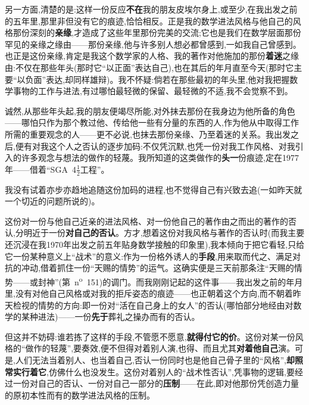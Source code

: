 另一方面,清楚的是:这样一份反应\textbf{不在}我的朋友皮埃尔身上,或至少,在我出发之前的五年里,那里非但没有它的痕迹,恰恰相反。正是我的数学进法风格与他自己的风格那份深刻的\textbf{亲缘},才造成了这些年里那份完美的交流;它也是我们在数学层面那份罕见的亲缘之缘由——那份亲缘,他与许多别人想必都曾感到,一如我自己曾感到。也正是这份亲缘,肯定是我这个数学家的人格、我的著作对他施加的那份\textbf{着迷}之缘由:不仅在那些年头(那时它“以正面”表达自己),也在其后的年月直至今天(那时它主要“以负面”表达,却同样雄辩)。我不怀疑:倘若在那些最初的年头里,他对我把握数学事物的工作与进法,有过哪怕最轻微的保留、最轻微的不适,我不会觉察不到。

诚然,从那些年头起,我的朋友便竭尽所能,对外抹去那份在我身边为他所备的角色——哪怕只作为那个教过他、传给他一些有分量的东西的人,作为他从中取得工作所需的重要观念的人——更不必说,也抹去那份亲缘、乃至着迷的关系。我出发之后,便有对我这个人之否认的逐步加码:不仅凭沉默,也凭一份对我工作风格、对我引入的许多观念与想法的做作的轻蔑。我所知道的这类做作的\textbf{头一}份痕迹,定在1977年——借着“SGA~4$\frac{1}{2}$工程”。

我没有试着亦步亦趋地追随这份加码的进程,也不觉得自己有兴致去追(一如昨天就一个切近的问题所说的)。

这份对一份与他自己近亲的进法风格、对一份他自己的著作由之而出的著作的否认,分明近于一份\textbf{对自己的否认}。方才,想着这份对我风格与著作的否认时(而我主要还沉浸在我1970年出发之前五年贴身数学接触的印象里),我本倾向于把它看轻,只给它一份某种意义上“战术”的意义:作为一份格外诱人的\textbf{手段},用来取而代之、满足对抗的冲动,借着抓住一份“天赐的情势”的运气。这确实便是三天前那条注“天赐的情势——或封神”(第~n\textsuperscript{o}~151)的调门。而我刚刚记起的这件事——我出发之前的年月里,没有对他自己风格或对我的拒斥姿态的痕迹——也正朝着这个方向,而不朝着昨天检视的情势的方向:即一份对“活在自己身上的女人”的否认(哪怕部分地经由对数学的某种进法)——一份\textbf{先于}葬礼之操办而有的否认。

但这并不妨碍:谁若拣了这样的手段,不管愿不愿意,\textbf{就得付它的价}。这份对某一份风格的“做作的轻蔑”,要奏效,便不但得对着别人演,也得、而且尤其\textbf{对着他自己}演。可是,人们无法当着别人、也当着自己,否认一份同时也是他自己骨子里的“风格”,\textbf{却照常实行着它},仿佛什么也没发生。这份对着别人的“战术性否认”,凭事物的逻辑,要经过一份对自己的否认、一份对自己一部分的\textbf{压制}——在此,即对他那份凭创造力量的原初本性而有的数学进法风格的压制。

